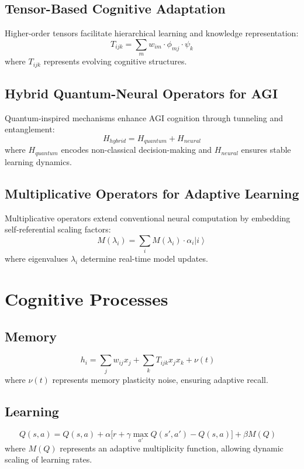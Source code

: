 \documentclass{article}
\theoremstyle{plain}
\begin{document}
\subsection{Tensor-Based Cognitive Adaptation}
Higher-order tensors facilitate hierarchical learning and knowledge representation:
\begin{equation}
    T_{ijk} = \sum_{m} w_{im} \cdot \phi_{mj} \cdot \psi_k
\end{equation}
where $T_{ijk}$ represents evolving cognitive structures.

\subsection{Hybrid Quantum-Neural Operators for AGI}
Quantum-inspired mechanisms enhance AGI cognition through tunneling and entanglement:
\begin{equation}
    H_{hybrid} = H_{quantum} + H_{neural}
\end{equation}
where $H_{quantum}$ encodes non-classical decision-making and $H_{neural}$ ensures stable learning dynamics.

\subsection{Multiplicative Operators for Adaptive Learning}
Multiplicative operators extend conventional neural computation by embedding self-referential scaling factors:
\begin{equation}
    M(\lambda_i) = \sum_i M(\lambda_i) \cdot \alpha_i \left| i \right\rangle
\end{equation}
where eigenvalues $\lambda_i$ determine real-time model updates.
\section{Cognitive Processes}

\subsection{Memory}
\begin{equation}
    h_i = \sum_{j} w_{ij} x_j + \sum_{k} T_{ijk} x_j x_k + \nu(t) 
    \quad
\end{equation}
where $\nu(t)$ represents memory plasticity noise, ensuring adaptive recall.

\subsection{Learning}
\begin{equation}
    Q(s, a) = Q(s, a) + \alpha \big[r + \gamma \max_{a'} Q(s', a') - Q(s, a)\big] 
    + \beta M(Q) 
    \quad 
\end{equation}
where $M(Q)$ represents an adaptive multiplicity function, allowing dynamic scaling of learning rates.
\end{document}
